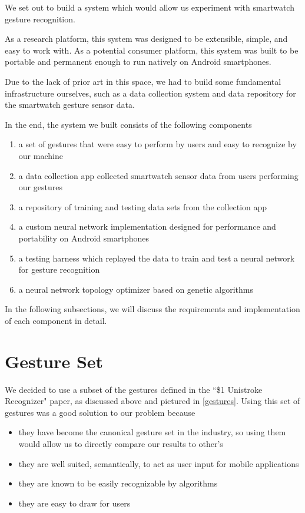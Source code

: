 \documentclass{report}
\begin{document}

We set out to build a system which would allow us experiment with smartwatch gesture recognition.

As a research platform, this system was designed to be extensible, simple, and easy to work with. As a potential consumer platform, this system was built to be portable and permanent enough to run natively on Android smartphones.

Due to the lack of prior art in this space, we had to build some fundamental infrastructure ourselves, such as a data collection system and data repository for the smartwatch gesture sensor data.

In the end, the system we built consists of the following components
\begin{enumerate}
\item a set of gestures that were easy to perform by users and easy to recognize by our machine
\item a data collection app collected smartwatch sensor data from users performing our gestures
\item a repository of training and testing data sets from the collection app
\item a custom neural network implementation designed for performance and portability on Android smartphones
\item a testing harness which replayed the data to train and test a neural network for gesture recognition
\item a neural network topology optimizer based on genetic algorithms
\end{enumerate}

In the following subsections, we will discuss the requirements and implementation of each component in detail.

\section{Gesture Set}


We decided to use a subset of the gestures defined in the ``\$1 Unistroke Recognizer" paper, as discussed above and pictured in \ref{gestures}. Using this set of gestures was a good solution to our problem because
\begin{itemize}
\item they have become the canonical gesture set in the industry, so using them would allow us to directly compare our results to other's
\item they are well suited, semantically, to act as user input for mobile applications
\item they are known to be easily recognizable by algorithms
\item they are easy to draw for users
\end{itemize}
\end{document}
